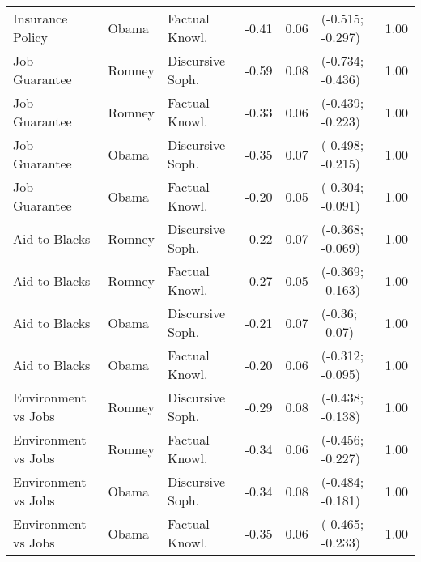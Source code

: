 \begin{table}[ht]
\begin{tabular}{lllrrlr}
  Insurance Policy & Obama & Factual Knowl. & -0.41 & 0.06 & (-0.515; -0.297) & 1.00 \\ 
  Job Guarantee & Romney & Discursive Soph. & -0.59 & 0.08 & (-0.734; -0.436) & 1.00 \\ 
  Job Guarantee & Romney & Factual Knowl. & -0.33 & 0.06 & (-0.439; -0.223) & 1.00 \\ 
  Job Guarantee & Obama & Discursive Soph. & -0.35 & 0.07 & (-0.498; -0.215) & 1.00 \\ 
  Job Guarantee & Obama & Factual Knowl. & -0.20 & 0.05 & (-0.304; -0.091) & 1.00 \\ 
  Aid to Blacks & Romney & Discursive Soph. & -0.22 & 0.07 & (-0.368; -0.069) & 1.00 \\ 
  Aid to Blacks & Romney & Factual Knowl. & -0.27 & 0.05 & (-0.369; -0.163) & 1.00 \\ 
  Aid to Blacks & Obama & Discursive Soph. & -0.21 & 0.07 & (-0.36; -0.07) & 1.00 \\ 
  Aid to Blacks & Obama & Factual Knowl. & -0.20 & 0.06 & (-0.312; -0.095) & 1.00 \\ 
  Environment vs Jobs & Romney & Discursive Soph. & -0.29 & 0.08 & (-0.438; -0.138) & 1.00 \\ 
  Environment vs Jobs & Romney & Factual Knowl. & -0.34 & 0.06 & (-0.456; -0.227) & 1.00 \\ 
  Environment vs Jobs & Obama & Discursive Soph. & -0.34 & 0.08 & (-0.484; -0.181) & 1.00 \\ 
  Environment vs Jobs & Obama & Factual Knowl. & -0.35 & 0.06 & (-0.465; -0.233) & 1.00 \\ 
   \hline
\end{tabular}
\end{table}
